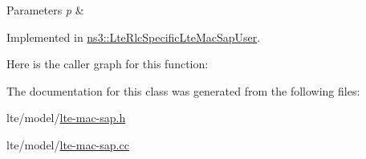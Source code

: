 \begin{DoxyParams}{Parameters}
{\em p} & \\
\hline
\end{DoxyParams}


Implemented in \hyperlink{classns3_1_1LteRlcSpecificLteMacSapUser_af0de831da82d5390666dc9fb8a7108d6}{ns3\+::\+Lte\+Rlc\+Specific\+Lte\+Mac\+Sap\+User}.



Here is the caller graph for this function\+:




The documentation for this class was generated from the following files\+:\begin{DoxyCompactItemize}
\item 
lte/model/\hyperlink{lte-mac-sap_8h}{lte-\/mac-\/sap.\+h}\item 
lte/model/\hyperlink{lte-mac-sap_8cc}{lte-\/mac-\/sap.\+cc}\end{DoxyCompactItemize}
